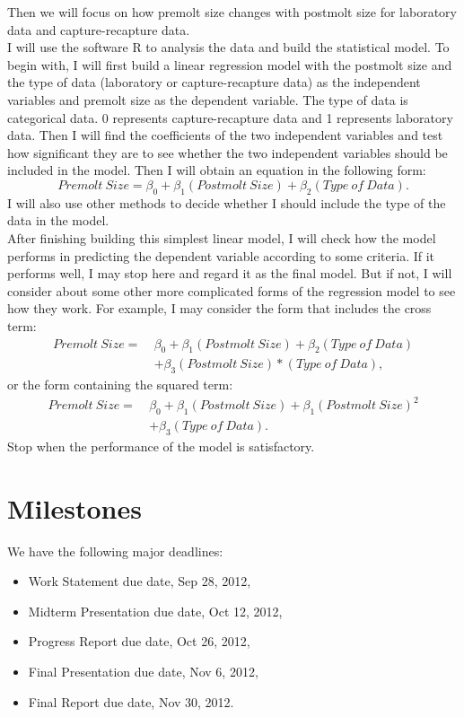\documentclass[12pt,letterpaper]{article}
\theoremstyle{definition}
\begin{document}
\noindent Then we will focus on how premolt size changes with postmolt size for laboratory data and capture-recapture data.\\
I will use the software R to analysis the data and build the statistical model. To begin with, I will first build a linear regression model with the postmolt size and the type of data (laboratory or capture-recapture data) as the independent variables and premolt size as the dependent variable. The type of data is categorical data. 0 represents capture-recapture data and 1 represents laboratory data. Then I will find the coefficients of the two independent variables and test how significant they are to see whether the two independent variables should be included in the model. Then I will obtain an equation in the following form:
$$Premolt~Size=\beta_0 + \beta_1 (Postmolt~Size) + \beta_2 (Type~of~Data).$$ 
I will also use other methods to decide whether I should include the type of the data in the model.\\
After finishing building this simplest linear model, I will check how the model performs in predicting the dependent variable according to some criteria. If it performs well, I may stop here and regard it as the final model. But if not, I will consider about some other more complicated forms of the regression model to see how they work. For example, I may consider the form that includes the cross term:
\begin{align*}
Premolt~Size = ~&\beta_0 + \beta_1 (Postmolt~Size) + \beta_2 (Type~of~Data)\\
               & + \beta_3 (Postmolt~Size)*(Type~of~Data),
\end{align*}
or the form containing the squared term:
\begin{align*}
Premolt~Size = ~&\beta_0 + \beta_1 (Postmolt~Size) + \beta_1 (Postmolt~Size)^2\\
               & + \beta_3 (Type~of~Data).
\end{align*}
Stop when the performance of the model is satisfactory.

\section{Milestones}
We have the following major deadlines:
\begin{itemize}
    \item Work Statement due date, Sep 28, 2012,
    \item Midterm Presentation due date, Oct 12, 2012,
    \item Progress Report due date, Oct 26, 2012,
    \item Final Presentation due date, Nov 6, 2012,
    \item Final Report due date, Nov 30, 2012.
\end{itemize}
\end{document}
